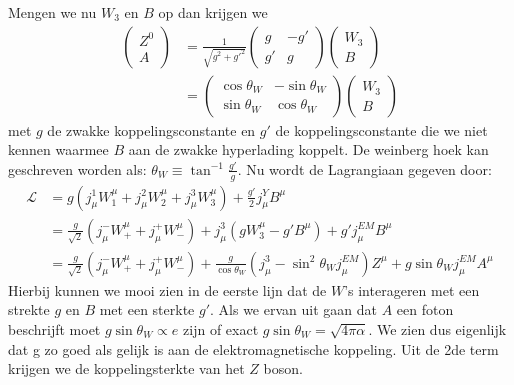 \documentclass[../main.tex]{subfiles}
\begin{document}
Mengen we nu $W_3$ en $B$ op dan krijgen we 
\begin{equation}
    \begin{aligned}
        \label{eq:w_b_mixing}
        \begin{pmatrix}
            Z^0\\
            A
        \end{pmatrix}
        &= \frac{1}{\sqrt{g^2+g'^2}} 
        \begin{pmatrix}
            g & -g'\\
            g' & g
        \end{pmatrix}
        \begin{pmatrix}
            W_3\\
            B
        \end{pmatrix}\\
        &=
        \begin{pmatrix}
            \cos\theta_W & -\sin\theta_W\\
            \sin\theta_W & \cos\theta_W
        \end{pmatrix}
        \begin{pmatrix}
            W_3\\
            B
        \end{pmatrix}
    \end{aligned}
\end{equation}
met $g$ de zwakke koppelingsconstante en $g'$ de koppelingsconstante die we niet kennen waarmee $B$ aan de zwakke hyperlading koppelt. De weinberg hoek kan geschreven worden als: $\theta_W\equiv \tan^{-1} \frac{g'}{g}$. Nu wordt de Lagrangiaan gegeven door:
\begin{equation}
    \begin{aligned}
        \label{eq:elektozwakke_lagrangiaan}
        \mathcal{L} &= g(j_\mu^1W_1^\mu+j_\mu^2W_2^\mu+j_\mu^3W_3^\mu)+ \frac{g'}{2} j_\mu^YB^\mu\\
                    &= \frac{g}{\sqrt{2}} (j_\mu^-W_+^\mu+j_\mu^+W_-^\mu) + j_\mu^3(gW_3^\mu-g'B^\mu) + g'j_\mu^{EM}B^\mu\\
                    &= \frac{g}{\sqrt{2}} (j_\mu^-W_+^\mu+j_\mu^+W_-^\mu) + \frac{g}{\cos\theta_W} (j_\mu^3 - \sin^2\theta_Wj_\mu^{EM})Z^\mu + g\sin\theta_Wj_\mu^{EM}A^\mu
    \end{aligned}
\end{equation}
Hierbij kunnen we mooi zien in de eerste lijn dat de $W$'s interageren met een strekte $g$ en $B$ met een sterkte $g'$. Als we ervan uit gaan dat $A$ een foton beschrijft moet $g\sin\theta_W \propto e$ zijn of exact $g\sin\theta_W = \sqrt{4\pi\alpha}$. We zien dus eigenlijk dat g zo  goed als gelijk is aan de elektromagnetische koppeling. Uit de 2de term krijgen we de koppelingsterkte van het $Z$ boson.
\end{document}
